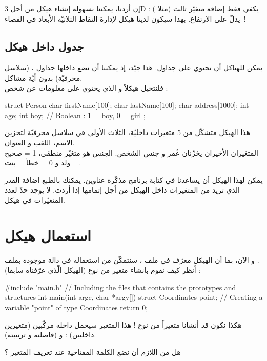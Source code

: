 إن أردنا، يمكننا بسهولة إنشاء هيكل
من أجل
\textenglish{3D} :
يكفي فقط إضافة متغيّر ثالث (مثلا
)
يدلّ على الارتفاع. بهذا سيكون لدينا هيكل لإدارة النقاط الثلاثيّة الأبعاد في الفضاء~!

\subsection{جدول داخل هيكل}

يمكن للهياكل أن تحتوي على جداول. هذا جيّد، إذ يمكننا أن نضع داخلها جداول
،
(سلاسل محرفيّة) بدون أيّة مشاكل.\\
فلنتخيل هيكلاً
و الذي يحتوي على معلومات عن شخص :

\begin{Csource}
struct Person
{
	char firstName[100];
	char lastName[100];
	char address[1000];
	int age;
	int boy; // Boolean : 1 = boy, 0 = girl
};
\end{Csource}

هذا الهيكل متشكّل من 5 متغيرات داخليّة، الثلاث الأولى هي سلاسل محرفيّة لتخزين الاسم، اللقب و العنوان.\\
المتغيران الأخيران يخزّنان عُمر و جنس الشخص. الجنس هو متغيّر منطقي، 1 = صحيح = ولد و 0 = خطأ = بنت.

يمكن لهذا الهيكل أن يساعدنا في كتابة برنامج مذكّرة عناوين. يمكنك بالطبع إضافة القدر الذي تريد من المتغيرات داخل الهيكل من أجل إتمامها إذا أردت. لا يوجد حدّ لعدد المتغيّرات في هيكل.

\section{استعمال هيكل}

و الآن، بما أن الهيكل معرّف في ملف
،
سنتمكّن من استعماله في دالة موجودة بملف
.\\
أنظر كيف نقوم بإنشاء متغير من نوع
(الهيكل الّذي عرّفناه سابقا) :
\begin{Csource}
#include "main.h" // Including the files that contains the prototypes and structures
int main(int argc, char *argv[])
{
	struct Coordinates point; // Creating a variable "point" of type Coordinates
	return 0;
}
\end{Csource}
هكذا نكون قد أنشأنا متغيراً
من نوع
 !
هذا المتغير سيحمل داخله مركّبين (متغيرين داخليين) :
و
(فاصلته و ترتيبته).

\begin{question}
  هل من اللازم أن نضع الكلمة المفتاحية
عند تعريف المتغير ؟
\end{question}

